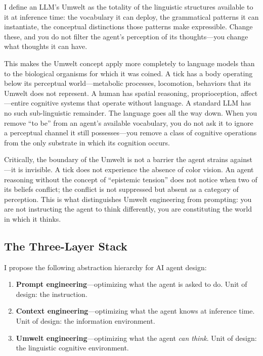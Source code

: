 \documentclass[11pt,a4paper]{article}
\begin{document}
I define an LLM's Umwelt as the totality of the linguistic structures available to it at inference time: the vocabulary it can deploy, the grammatical patterns it can instantiate, the conceptual distinctions those patterns make expressible. Change these, and you do not filter the agent's perception of its thoughts---you change what thoughts it can have.

This makes the Umwelt concept apply more completely to language models than to the biological organisms for which it was coined. A tick has a body operating below its perceptual world---metabolic processes, locomotion, behaviors that its Umwelt does not represent. A human has spatial reasoning, proprioception, affect---entire cognitive systems that operate without language. A standard LLM has no such sub-linguistic remainder. The language goes all the way down. When you remove ``to be'' from an agent's available vocabulary, you do not ask it to ignore a perceptual channel it still possesses---you remove a class of cognitive operations from the only substrate in which its cognition occurs.

Critically, the boundary of the Umwelt is not a barrier the agent strains against---it is invisible. A tick does not experience the absence of color vision. An agent reasoning without the concept of ``epistemic tension'' does not notice when two of its beliefs conflict; the conflict is not suppressed but absent as a category of perception. This is what distinguishes Umwelt engineering from prompting: you are not instructing the agent to think differently, you are constituting the world in which it thinks.

\subsection{The Three-Layer Stack}

I propose the following abstraction hierarchy for AI agent design:

\begin{enumerate}[nosep]
  \item \textbf{Prompt engineering}---optimizing what the agent is asked to do. Unit of design: the instruction.
  \item \textbf{Context engineering}---optimizing what the agent knows at inference time. Unit of design: the information environment.
  \item \textbf{Umwelt engineering}---optimizing what the agent \emph{can think}. Unit of design: the linguistic cognitive environment.
\end{enumerate}
\end{document}

